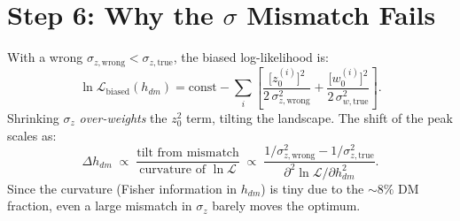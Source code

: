 \documentclass[12pt]{article}
\begin{document}
\section*{Step 6: Why the $\sigma$ Mismatch Fails}

With a wrong $\sigma_{z,\mathrm{wrong}} < \sigma_{z,\mathrm{true}}$, the biased log-likelihood is:
\[
  \ln\mathcal{L}_\mathrm{biased}(h_{dm})
  = \mathrm{const}
    - \sum_{i}
      \left[
        \frac{\bigl[z_0^{(i)}\bigr]^{2}}{2\,\sigma_{z,\mathrm{wrong}}^{2}}
        +
        \frac{\bigl[w_0^{(i)}\bigr]^{2}}{2\,\sigma_{w,\mathrm{true}}^{2}}
      \right].
\]
Shrinking $\sigma_z$ \emph{over-weights} the $z_0^2$ term, tilting the landscape.
The shift of the peak scales as:
\[
  \Delta h_{dm} \;\propto\;
  \frac{\text{tilt from mismatch}}{\text{curvature of }\ln\mathcal{L}}
  \;\propto\;
  \frac{1/\sigma_{z,\mathrm{wrong}}^{2} - 1/\sigma_{z,\mathrm{true}}^{2}}
       {\;\partial^2 \ln\mathcal{L}/\partial h_{dm}^2\;}.
\]
Since the curvature (Fisher information in $h_{dm}$) is tiny due to the $\sim 8\%$
DM fraction, even a large mismatch in $\sigma_z$ barely moves the optimum.
\end{document}
